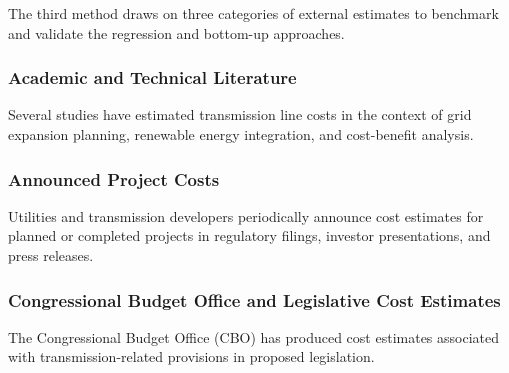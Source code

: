 \documentclass[12pt]{article}
\begin{document}
The third method draws on three categories of external estimates to benchmark and validate the regression and bottom-up approaches.

\subsubsection{Academic and Technical Literature}

Several studies have estimated transmission line costs in the context of grid expansion planning, renewable energy integration, and cost-benefit analysis. %



\subsubsection{Announced Project Costs}

Utilities and transmission developers periodically announce cost estimates for planned or completed projects in regulatory filings, investor presentations, and press releases. %

% 

\subsubsection{Congressional Budget Office and Legislative Cost Estimates}

The Congressional Budget Office (CBO) has produced cost estimates associated with transmission-related provisions in proposed legislation. %
\end{document}
